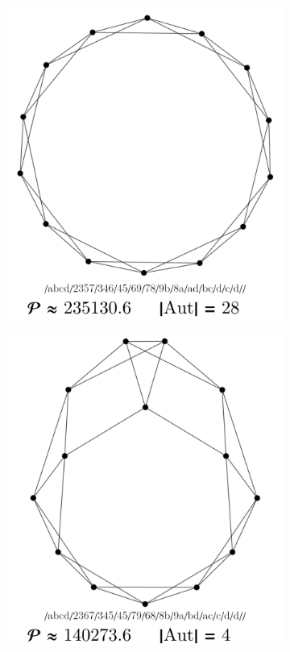 \documentclass[12pt,a4paper]{article}
\renewcommand{\|}{\rule[-0.4ex]{0.2ex}{1.2em}}
\begin{document}
\begin{figure}[htb]
	\begin{subfigure}[b]{.24 \textwidth}
		\includegraphics[width=\linewidth]{largest_12_1}
		\subcaption{}
	\end{subfigure}
	\begin{subfigure}[b]{.24 \textwidth}
		\includegraphics[width=\linewidth]{largest_12_2}

\end{subfigure}
\end{figure}
\end{document}
